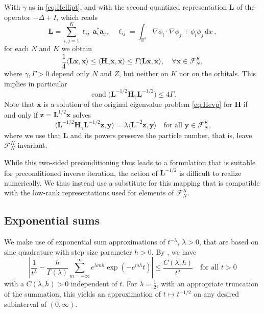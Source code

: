 \documentclass[a4paper,11pt,oneside]{amsart}
\theoremstyle{definition}
\theoremstyle{remark}
\newcommand{\cF}{{\mathcal{F}}}
\newcommand{\sdd}{\,\mathrm{d}}
\newcommand{\R}{\mathbb{R}}
\newcommand{\ten}[1]{\boldsymbol{#1}}
\numberwithin{equation}{section}
\numberwithin{theorem}{section}
\begin{document}
With $\gamma$ as in \eqref{eq:Hellipt}, and with the second-quantized representation $\ten L$ of the operator $-\Delta + I$, which reads 
\begin{equation}\label{eq:Ldef}
   \ten L =  \sum_{i,j = 1}^K \ell_{ij}\, \ten a_i^\ast \ten a_j, \quad \ell_{ij} = \int_{\R^3} \nabla \phi_i \cdot \nabla \phi_j + \phi_i \phi_j \sdd x\,,
\end{equation}
for each $N$ and $K$ we obtain
\begin{equation}
   \textstyle \frac14 \displaystyle \langle  \ten L  \ten  x , \ten x\rangle  \leq  \langle \ten H_\gamma \ten x , \ten x \rangle \leq \Gamma \langle \ten L \ten x,\ten x\rangle, \quad
    \forall \ten x \in \cF_N^K, 
\end{equation}
where $\gamma, \Gamma > 0$ depend only $N$ and $Z$, but neither on $K$ nor on the orbitals. This implies in particular
\begin{equation}\label{eq:Lcond}
  \operatorname{cond} \bigl( \ten L^{-1/2}  \ten H_\gamma \ten L^{-1/2}  \bigr) \leq 4 \Gamma.
\end{equation}
Note that $\ten x$ is a solution of the original eigenvalue problem \cref{eq:Hevp} for $\ten H$ if and only if $\ten z = \ten L^{1/2} \ten x$ solves
\[
   \langle  \ten L^{-1/2}  \ten H_\gamma \ten L^{-1/2}  \ten z, \ten y \rangle = \lambda \langle \ten L^{-2} \ten z, \ten y \rangle \quad\text{for all $\ten y \in \mathcal{F}_N^K$,}
\]
where we use that $\ten L$ and its powers preserve the particle number, that is, leave $\mathcal{F}_N^K$ invariant. 

While this two-sided preconditioning thus leads to a formulation that is suitable for preconditioned inverse iteration, the action of $ \ten L^{-1/2}$ is difficult to realize numerically.
We thus instead use a substitute for this mapping that is compatible with the low-rank representations used for elements of $\mathcal{F}_N^K$.

\subsection{Exponential sums}\label{sec:expsum}

We make use of exponential sum approximations of $t^{-\lambda}$, $\lambda > 0$, that are based on sinc quadrature with step size parameter $h > 0$. By \cite[Lemma 5.3]{Scholz_2017}, we have
\begin{equation}
 \left| \frac{1}{t^\lambda} - \frac{h}{\Gamma(\lambda)} \sum_{m = -\infty}^\infty e^{\lambda m h} \exp(-e^{m h} t) \right| \leq \frac{C(\lambda,h)}{t^\lambda} \quad \text{for all $t > 0$}
\end{equation}
with a $C(\lambda, h)>0$ independent of $t$. 
For $\lambda = \frac12$, with an appropriate truncation of the summation, this yields an approximation of $t\mapsto t^{-1/2}$ on any desired subinterval of $(0, \infty)$.
\end{document}
